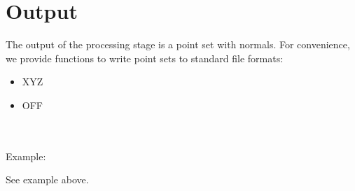 \section{Output}

The output of the processing stage is a point set with normals.
For convenience, we provide functions to write point sets to standard file formats:
\begin{itemize}
\item XYZ
\item OFF
\end{itemize}

  \\
  \\

Example:

See  example above.

